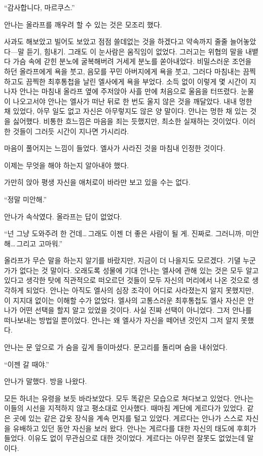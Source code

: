 ``감사합니다, 마르쿠스.''

\textbreak

안나는 올라프를 깨우려 할 수 있는 것은 모조리 했다.

사과도 해보았고 빌어도 보았고 점점 쓸데없는 것을 하겠다고 약속까지 줄줄 늘어놓았다—말 듣기, 힘내기. 그래도 이 눈사람은 움직임이 없었다. 그러고는 위협의 말을 내뱉다 가슴 속에 갇힌 분노에 굴복해버려 거세게 분노를 쏟아내었다. 비밀스러운 조언을 하던 올라프에게 욕을 붓고, 음모를 꾸민 아버지에게 욕을 붓고, 그러다 마침내는 끔찍하고도 끔찍한 최후통첩을 날린 엘사에게 욕을 부었다. 소득 없이 이렇게 몇 시간이 지나자 안나는 마침내 올라프 옆에 주저앉아 사흘 만에 처음으로 울음을 터뜨렸다. 눈물이 나오고서야 안나는 엘사가 떠난 뒤로 한 번도 울지 않은 것을 깨달았다. 내내 멍한 채 있었다, 아무 일도 없고 자신은 아무렇지도 않은 양 말이다. 안나는 멍한 채 있는 것을 싫어했다. 비통한 흐느낌은 마음을 죄는 듯했지만, 최소한 실재하는 것이었다. 이러한 것들이 그러듯 시간이 지나면 가시리라.

마음이 풀어지는 느낌이 들었다. 엘사가 사라진 것을 마침내 인정한 것이다.

이제는 무엇을 해야 하는지 알아내야 했다.

가만히 앉아 평생 자신을 애처로이 바라만 보고 있을 수는 없다.

``정말 미안해.''

안나가 속삭였다. 올라프는 답이 없었다.

``넌 그냥 도와주려 한 건데\ldots\,그래도 이젠 더 좋은 사람이 될 게. 진짜로. 그러니까, 미안해\ldots\,그리고 고마워.''

올라프가 무슨 말을 하는지 알기를 바랐지만, 지금이 더 나을지도 모르겠다. 기댈 누군가가 없다는 것 말이다. 오래도록 성물에 기대 안나는 엘사에 관해 있는 것은 모두 알고 있다고 생각한 탓에 직관적으로 떠오르던 것들이 모두 자신의 머리에서 나온 것으로 생각하게 되었다. 안나는 아직도 엘사의 심장 조각이 어디로 사라졌는지 알지 못했지만, 이 지지대 없이는 이해할 수가 없었다. 엘사의 고통스러운 최후통첩도 엘사 자신은 안나가 어떤 선택을 할지 알고 있었을 것이다. 사실 진짜 선택이 아니었다. 그저 안나를 떠나보내는 방법일 뿐이었다. 안나는 왜 엘사가 자신을 떼어낸 것인지 그저 알지 못했다.

안나는 문 앞으로 가 숨을 깊게 들이마셨다. 문고리를 돌리며 숨을 내쉬었다.

``이젠 갈 때야.''

안나가 말했다. 방을 나왔다.

모든 하녀는 유령을 보듯 바라보았다. 모두 똑같은 모습으로 쳐다보고 있었다. 안나는 이들의 시선을 지적하지 않고 평소대로 인사했다. 때마침 계단에 게르다가 있었다. 같은 곳에 있는 같은 갑옷 장식을 계속 먼지를 털고 있었다. 게르다는 안나가 스스로 자신을 유배하고 있던 동안 자신을 보러 왔다. 안나는 게르다를 대한 자신의 태도에 후회가 들었다. 이유도 없이 무관심으로 대한 것이었다. 게르다는 아무런 잘못도 없었는데 말이다.


